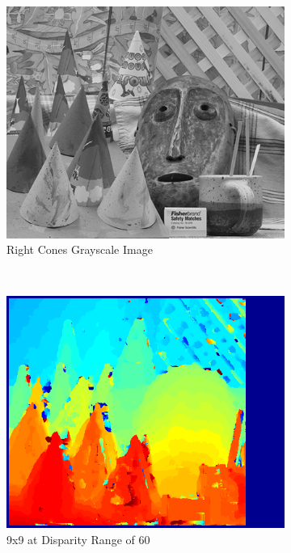 \begin{figure}
\begin{center}
\begin{subfigure}{0.45\textwidth}
		\includegraphics[width=\textwidth]{figures/conesR.png}
		\caption{Right Cones Grayscale Image}
		\label{fig:conesR}
	\end{subfigure}
	\\
	\begin{subfigure}{0.45\textwidth}
		\includegraphics[width=\textwidth]{figures/cones_9x9_matlab_0-59.png}
		\caption{9x9 at Disparity Range of 60 ~\cite{matlab}}
		\label{fig:conesMatlab}
	\end{subfigure}
	\begin{subfigure}{0.45\textwidth}

\end{subfigure}
\end{center}
\end{figure}
